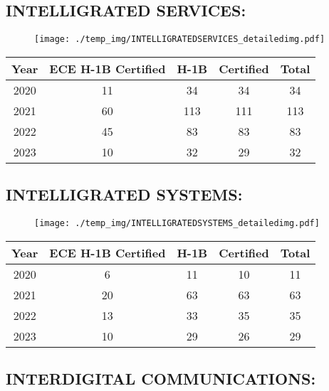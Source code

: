 \documentclass{article}%
\begin{document}
%
\newpage%
\subsection{INTELLIGRATED SERVICES:}%
\label{subsec:INTELLIGRATEDSERVICES}%
\label{INTELLIGRATEDSERVICESdetailed}%


\begin{figure}[htbp]%
\centering%
\texttt{[image: ./temp\_img/INTELLIGRATEDSERVICES\_detailedimg.pdf]}%
\end{figure}

%
\begin{longtable}{c|c|c|c|c}%
\hline%
Year&ECE H{-}1B Certified&H{-}1B&Certified&Total\\%
\hline%
2020&11&34&34&34\\%
\hline%
2021&60&113&111&113\\%
\hline%
2022&45&83&83&83\\%
\hline%
2023&10&32&29&32\\%
\hline%
\end{longtable}

%
\newpage%
\subsection{INTELLIGRATED SYSTEMS:}%
\label{subsec:INTELLIGRATEDSYSTEMS}%
\label{INTELLIGRATEDSYSTEMSdetailed}%


\begin{figure}[htbp]%
\centering%
\texttt{[image: ./temp\_img/INTELLIGRATEDSYSTEMS\_detailedimg.pdf]}%
\end{figure}

%
\begin{longtable}{c|c|c|c|c}%
\hline%
Year&ECE H{-}1B Certified&H{-}1B&Certified&Total\\%
\hline%
2020&6&11&10&11\\%
\hline%
2021&20&63&63&63\\%
\hline%
2022&13&33&35&35\\%
\hline%
2023&10&29&26&29\\%
\hline%
\end{longtable}

%
\newpage%
\subsection{INTERDIGITAL COMMUNICATIONS:}%
\label{subsec:INTERDIGITALCOMMUNICATIONS}%
\label{INTERDIGITALCOMMUNICATIONSdetailed}%
\end{document}
